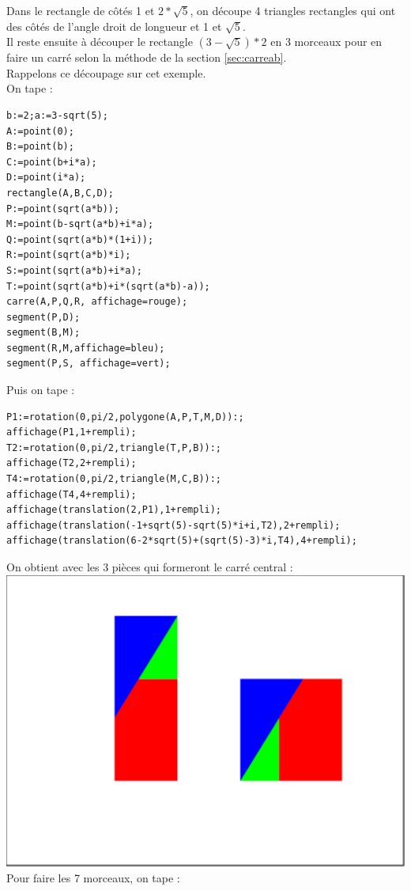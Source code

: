 \documentclass[a4paper,11pt]{book}
\begin{document}
Dans le rectangle de c\^ot\'es 1 et $2*\sqrt 5$, on d\'ecoupe 4 triangles rectangles qui ont des 
c\^ot\'es de l'angle droit de longueur et 1 et $\sqrt 5$. \\
Il reste ensuite \`a d\'ecouper le rectangle $(3-\sqrt 5)*2$ en 3 morceaux pour
en faire un carr\'e selon la m\'ethode de la section \ref{sec:carreab}.\\
Rappelons ce d\'ecoupage sur cet exemple.\\
On tape :
\begin{verbatim}
b:=2;a:=3-sqrt(5);
A:=point(0);
B:=point(b);
C:=point(b+i*a);
D:=point(i*a);
rectangle(A,B,C,D);
P:=point(sqrt(a*b));
M:=point(b-sqrt(a*b)+i*a);
Q:=point(sqrt(a*b)*(1+i));
R:=point(sqrt(a*b)*i);
S:=point(sqrt(a*b)+i*a);
T:=point(sqrt(a*b)+i*(sqrt(a*b)-a));
carre(A,P,Q,R, affichage=rouge);
segment(P,D);
segment(B,M);
segment(R,M,affichage=bleu);
segment(P,S, affichage=vert);
\end{verbatim}
Puis on tape :
\begin{verbatim}
P1:=rotation(0,pi/2,polygone(A,P,T,M,D)):;
affichage(P1,1+rempli);
T2:=rotation(0,pi/2,triangle(T,P,B)):;
affichage(T2,2+rempli);
T4:=rotation(0,pi/2,triangle(M,C,B)):;
affichage(T4,4+rempli);
affichage(translation(2,P1),1+rempli);
affichage(translation(-1+sqrt(5)-sqrt(5)*i+i,T2),2+rempli);
affichage(translation(6-2*sqrt(5)+(sqrt(5)-3)*i,T4),4+rempli);
\end{verbatim}
On obtient avec les 3 pi\`eces qui formeront le carr\'e central :\\
\includegraphics[width=\textwidth]{carresqrt36}\\
Pour faire les 7 morceaux, on tape :
\end{document}
